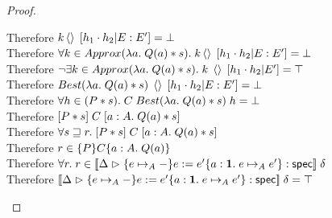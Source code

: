 \begin{proof}
\begin{tabbedproof}
    \ooooooo Therefore $k\left<\right>\;[h_1\cdot h_2|E:E'] = \bot$ \\
    \oooooo Therefore $\forall k \in Approx(\lambda a.\;Q(a) * s).\; k\left<\right>\;[h_1\cdot h_2|E:E'] = \bot$ \\
    \oooooo Therefore $\lnot \exists k \in Approx(\lambda a.\;Q(a) * s).\; k\;\left<\right>\;[h_1 \cdot h_2|E'] = \top$ \\
    \oooooo Therefore $Best(\lambda a.\;Q(a) * s)\;\left<\right>\;[h_1 \cdot h_2|E:E'] = \bot$ \\
    \ooooo Therefore $\forall h \in (P * s).\; C\;Best(\lambda a.\;Q(a) * s)\;h = \bot$ \\
    \ooooo Therefore $[{P * s}]\;{C}\;[{a:A}.\;{Q(a) * s}]$ \\
    \oooo Therefore $\forall s \sqsupseteq r.\; [{P * s}]\;{C}\;[{a:A}.\;{Q(a) * s}]$ \\
    \oooo Therefore $r \in \{{P}\}{C}\{{a:A}.\;{Q(a)}\}$ \\
    \ooo Therefore $\forall r.\; r \in [\![{{\Delta} \vartriangleright {\{{e \mapsto_A -}\}{e := e'}\{{a:\mathbf{1}}.\;{e \mapsto_A e'}\}} : \mathsf{spec}}]\!]\;\delta$ \\
    \ooo Therefore $[\![{{\Delta} \vartriangleright {\{{e \mapsto_A -}\}{e := e'}\{{a:\mathbf{1}}.\;{e \mapsto_A e'}\}} : \mathsf{spec}}]\!]\;\delta = \top$ \\
  \end{tabbedproof}
\end{proof}


